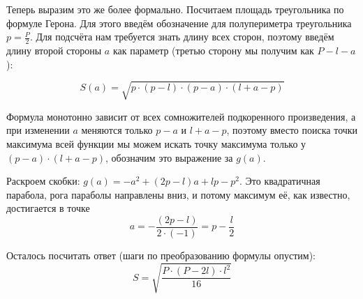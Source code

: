 \begin{itemize}
\begin{center}\end{center}


Теперь выразим это же более формально. 
Посчитаем площадь треугольника по формуле Герона. 
Для этого введём обозначение для полупериметра треугольника $p = \frac{P}{2}$.
Для подсчёта нам требуется знать длину всех 
сторон, поэтому введём длину второй стороны $a$ как параметр 
(третью сторону мы получим как $P-l-a$):

$$S(a) = \sqrt{p\cdot(p-l)\cdot(p-a)\cdot(l+a-p)}$$

Формула монотонно зависит от всех сомножителей подкоренного произведения, 
а при изменении $a$ меняются только $p-a$ и $l+a-p$, поэтому вместо поиска точки
максимума всей функции мы можем искать точку максимума только у $(p-a)\cdot(l+a-p)$,
обозначим это выражение за $g(a)$.

Раскроем скобки: $g(a) = -a^2 + (2p - l)a + lp - p^2$. Это квадратичная парабола, 
рога параболы направлены вниз, и потому максимум её, как известно, достигается в 
точке $$a = -\frac{(2p-l)}{2\cdot(-1)} = p-\frac{l}{2}$$

Осталось посчитать ответ (шаги по преобразованию формулы опустим): 
$$S = \sqrt{\frac{P\cdot(P-2l)\cdot l^2}{16}}$$

\end{itemize}

